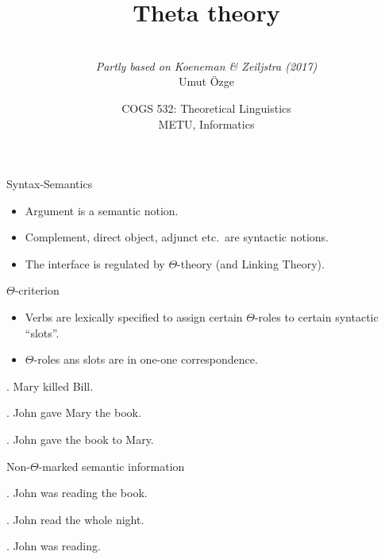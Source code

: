 \documentclass[ignorenonframetext,10pt,aspectratio=169]{beamer}
\title{Theta theory}
\author{\  \\  {\it Partly based on Koeneman \& Zeiljstra (2017)} \\ \vspace{20pt} Umut \"Ozge\\  }
\date{COGS 532: Theoretical Linguistics\\ METU, Informatics}
\begin{document}
\begin{frame}\frametitle{}
\thispagestyle{empty}
\maketitle
\end{frame}

\begin{frame}[t,plain]{}

\end{frame}

\begin{frame}[t,plain]{Syntax-Semantics}

\begin{itemize}
\item \alert{Argument} is a semantic notion.
\item \alert{Complement},  \alert{direct object}, \alert{adjunct} etc.\ are syntactic notions.
\item The interface is regulated by $\Theta$-theory (and Linking Theory).
\end{itemize}

\end{frame}

\begin{frame}[t,plain]{$\Theta$-criterion}
\begin{itemize}
\item Verbs are lexically specified to assign certain $\Theta$-roles to certain syntactic ``slots''.
\item $\Theta$-roles ans slots are in one-one correspondence.
\end{itemize}

\ex. Mary\hspace{40pt} killed\hspace{40pt} Bill. 

\medskip
\ex. John\hspace{40pt} gave\hspace{40pt} Mary\hspace{40pt} the book. 

\medskip
\ex. John\hspace{40pt} gave\hspace{40pt} the book\hspace{40pt} to Mary.

\end{frame}

\begin{frame}[t,plain]{Non-$\Theta$-marked semantic information}

\ex. John was reading the book.

\ex. John read the whole night.

\ex. John was reading.

\end{frame}
\end{document}
